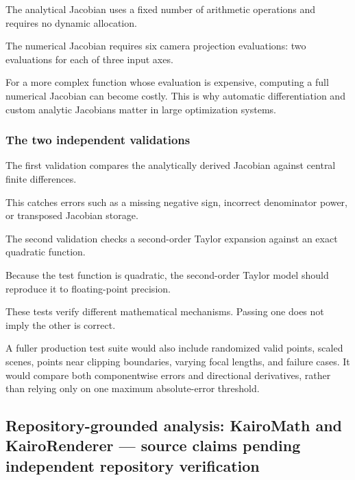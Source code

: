 The analytical Jacobian uses a fixed number of arithmetic operations and requires no dynamic allocation.

The numerical Jacobian requires six camera projection evaluations: two evaluations for each of three input axes.

For a more complex function whose evaluation is expensive, computing a full numerical Jacobian can become costly. This is why automatic differentiation and custom analytic Jacobians matter in large optimization systems.

\subsubsection{The two independent validations}\label{02-foundations-ii-ch021-the-two-independent-validations}

\hypertarget{02-foundations-ii-ch021-the-two-independent-validations}{}

The first validation compares the analytically derived Jacobian against central finite differences.

This catches errors such as a missing negative sign, incorrect denominator power, or transposed Jacobian storage.

The second validation checks a second-order Taylor expansion against an exact quadratic function.

Because the test function is quadratic, the second-order Taylor model should reproduce it to floating-point precision.

These tests verify different mathematical mechanisms. Passing one does not imply the other is correct.

A fuller production test suite would also include randomized valid points, scaled scenes, points near clipping boundaries, varying focal lengths, and failure cases. It would compare both componentwise errors and directional derivatives, rather than relying only on one maximum absolute-error threshold.

\subsection{Repository-grounded analysis: KairoMath and KairoRenderer --- source claims pending independent repository verification}\label{02-foundations-ii-ch021-repository-grounded-analysis-kairomath-and-kairorenderer-source-claims-pending-independent-repository-verification}

\hypertarget{02-foundations-ii-ch021-repository-grounded-analysis-kairomath-and-kairorenderer-source-claims-pending-independent-repository-verification}{}

